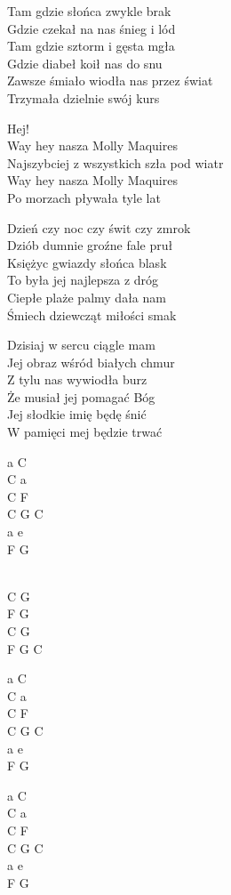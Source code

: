 \begin{text}
   
    Tam gdzie słońca zwykle brak\\ 
    Gdzie czekał na nas śnieg i lód\\ 
    Tam gdzie sztorm i gęsta mgła \\
    Gdzie diabeł koił nas do snu \\
    Zawsze śmiało wiodła nas przez świat \\
    Trzymała dzielnie swój kurs 

    \vin Hej!\\
    \vin Way hey nasza Molly Maquires\\ 
    \vin Najszybciej z wszystkich szła pod wiatr\\ 
    \vin Way hey nasza Molly Maquires \\
    \vin Po morzach pływała tyle lat 

    Dzień czy noc czy świt czy zmrok\\
    Dziób dumnie groźne fale pruł\\
    Księżyc gwiazdy słońca blask\\
    To była jej najlepsza z dróg\\
    Ciepłe plaże palmy dała nam\\
    Śmiech dziewcząt miłości smak

    Dzisiaj w sercu ciągle mam\\
    Jej obraz wśród białych chmur\\
    Z tylu nas wywiodła burz\\
    Że musiał jej pomagać Bóg\\
    Jej słodkie imię będę śnić\\
    W pamięci mej będzie trwać
   

\end{text}
\begin{chord}
    a C\\ 
    C a\\ 
    C F\\ 
    C G C\\ 
    a e\\ 
    F G
 
    ~\\
    C G\\ 
    F G\\ 
    C G\\ 
    F G C 

    a C\\ 
    C a\\ 
    C F\\ 
    C G C\\ 
    a e\\ 
    F G
 
    a C\\ 
    C a\\ 
    C F\\ 
    C G C\\ 
    a e\\ 
    F G
\end{chord}